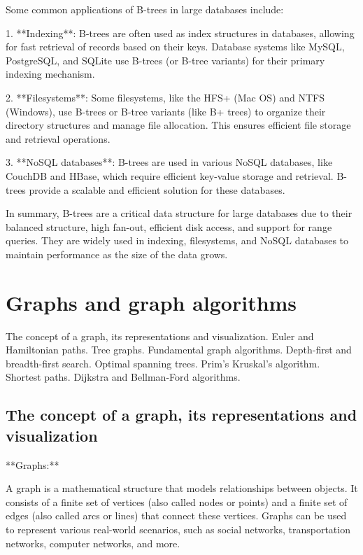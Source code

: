 \documentclass{article}
\begin{document}
Some common applications of B-trees in large databases include:

1. **Indexing**: B-trees are often used as index structures in databases, allowing for fast retrieval of records based on their keys. Database systems like MySQL, PostgreSQL, and SQLite use B-trees (or B-tree variants) for their primary indexing mechanism.

2. **Filesystems**: Some filesystems, like the HFS+ (Mac OS) and NTFS (Windows), use B-trees or B-tree variants (like B+ trees) to organize their directory structures and manage file allocation. This ensures efficient file storage and retrieval operations.

3. **NoSQL databases**: B-trees are used in various NoSQL databases, like CouchDB and HBase, which require efficient key-value storage and retrieval. B-trees provide a scalable and efficient solution for these databases.

In summary, B-trees are a critical data structure for large databases due to their balanced structure, high fan-out, efficient disk access, and support for range queries. They are widely used in indexing, filesystems, and NoSQL databases to maintain performance as the size of the data grows.


\section{Graphs and graph algorithms}

The concept of a graph, its representations and visualization. Euler and Hamiltonian paths. Tree graphs. Fundamental graph algorithms. Depth-first and breadth-first search. Optimal spanning trees. Prim’s Kruskal’s algorithm. Shortest paths. Dijkstra and Bellman-Ford algorithms.


\subsection{The concept of a graph, its representations and visualization}

**Graphs:**

A graph is a mathematical structure that models relationships between objects. It consists of a finite set of vertices (also called nodes or points) and a finite set of edges (also called arcs or lines) that connect these vertices. Graphs can be used to represent various real-world scenarios, such as social networks, transportation networks, computer networks, and more.
\end{document}
